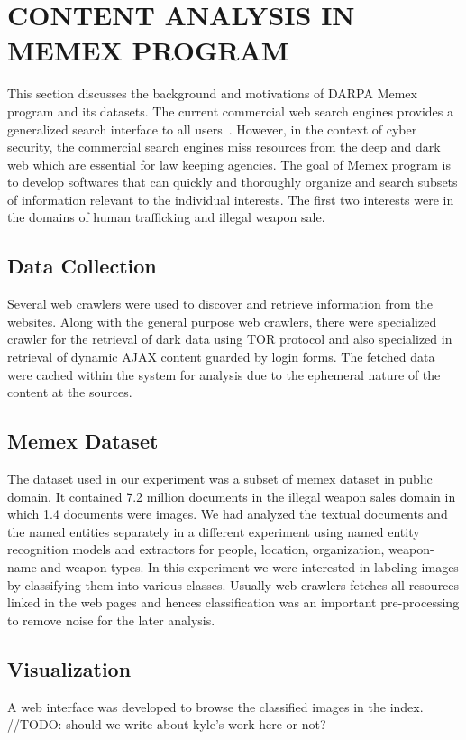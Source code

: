 \section{CONTENT ANALYSIS IN MEMEX PROGRAM} \label{sec:memex}
This section discusses the background and motivations of DARPA Memex program and its datasets. The current commercial web search engines provides a generalized search interface to all users~\cite{}. However, in the context of cyber security, the commercial search engines miss resources from the deep and dark web which are essential for law keeping agencies. The goal of Memex program is to develop softwares that can quickly and thoroughly organize and search subsets of information relevant to the individual interests. The first two interests were in the domains of human trafficking and illegal weapon sale.
\subsection{Data Collection}
\label{sec:memex-datacollection}
Several web crawlers were used to discover and retrieve information from the websites.
Along with the general purpose web crawlers, there were specialized crawler for the retrieval of dark data using TOR protocol \cite{} and also specialized in retrieval of dynamic AJAX content guarded by login forms. The fetched data were cached within the system for analysis due to the ephemeral nature of the content at the sources.

\subsection{Memex Dataset} \label{sec:memex-dataset}
The dataset used in our experiment was a subset of memex dataset in public domain. It contained 7.2 million documents in the illegal weapon sales domain in which 1.4 documents were images. We had analyzed the textual documents and the named entities separately in a different experiment using named entity recognition models and extractors for people, location, organization, weapon-name and weapon-types. In this experiment we were interested in labeling images by classifying them into various classes. Usually web crawlers fetches all resources linked in the web pages and hences classification was an important pre-processing to remove noise for the later analysis.

\subsection{Visualization} \label{sec:memex-visualization}
A web interface was developed to browse the classified images in the index. //TODO: should we write about kyle's work here or not?
